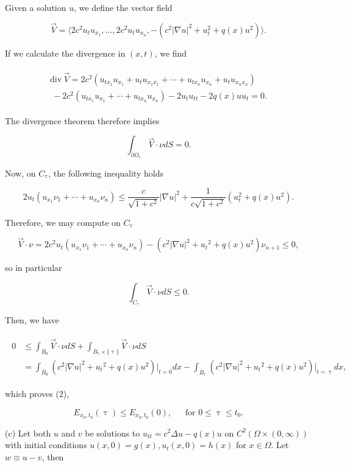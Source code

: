 \documentclass{article}
\begin{document}
Given a solution $u$, we define the vector field

$$\vec{V}=\langle 2c^2u_tu_{x_1},\dots,2c^2u_tu_{x_n},-(c^2|\nabla u|^2+u_t^2+q(x)u^2)\rangle.$$

If we calculate the divergence in $(x,t)$, we find

\begin{align*}
\begin{split}
\text{div} ~\vec{V}=2c^2(u_{tx_1}u_{x_1}+u_tu_{x_1x_1}+\cdots+u_{tx_n}u_{x_n}+u_tu_{x_nx_n})\\~-
        2c^2(u_{tx_1}u_{x_1}+\cdots+u_{tx_n}u_{x_n})-2u_tu_{tt}-2q(x)uu_t=0.
\end{split}
\end{align*}

The divergence theorem therefore implies

$$\int_{\partial\Omega_{\uptau}}\vec{V}\cdot\nu dS=0.$$

Now, on $C_{\uptau}$, the following inequality holds

$$2u_t(u_{x_1}\nu_1+\cdots+u_{x_n}\nu_n)\leq \frac{c}{\sqrt{1+c^2}}|\nabla u|^2 + \frac{1}{c\sqrt{1+c^2}}(u_t^2+q(x)u^2).$$

Therefore, we may compute on $C_{\uptau}$

$$\vec{V}\cdot\nu=2c^2u_t(u_{x_1}\nu_1+\cdots+u_{x_n}\nu_n)-(c^2|\nabla u|^2+{u_t}^2+q(x)u^2)\nu_{n+1}\leq 0,$$

so in particular

$$\int_{C_{\uptau}}\vec{V}\cdot\nu dS \leq 0.$$

Then, we have

\begin{align*}
\begin{split}
0 &\leq \int_{\overline{B}_0} \vec{V}\cdot\nu dS + \int_{\overline{B}_{\uptau}\times\{\uptau\}} \vec{V}\cdot\nu dS \\&=
\int_{\overline{B}_0}(c^2|\nabla u|^2+{u_t}^2+q(x)u^2)\big|_{t=0} dx - \int_{\overline{B}_{\uptau}} (c^2|\nabla u|^2+{u_t}^2+q(x)u^2)\big|_{t=\uptau} dx,
\end{split}
\end{align*}

which proves (2),

\begin{equation*}
E_{x_0,t_0}(\uptau)\leq E_{x_0,t_0}(0), ~~~~~~~\text{for $0\leq \uptau\leq t_0$}.
\end{equation*}

(c) Let both $u$ and $v$ be solutions to $u_{tt}=c^2\Delta u - q(x)u$ on $C^2(\Omega\times(0,\infty))$ with initial conditions $u(x,0)=g(x), u_t(x,0)=h(x)$ for $x\in\Omega$. Let $w\equiv u -v$, then
\end{document}
